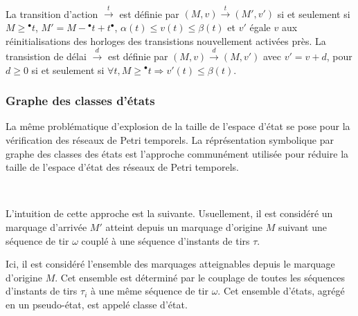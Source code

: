         ~

        La transition d'action $\xrightarrow{t}$ est définie par $(M,v)
        \xrightarrow{t}(M',v')$ si et seulement si $M \geq {}^{\bullet}t$, $M' =
        M - {}^{\bullet}t + t{}^{\bullet}$, $\alpha(t) \leq v(t) \leq \beta(t)$
        et $v'$ égale $v$ aux réinitialisations des horloges des transistions
        nouvellement activées près. La transistion de délai $\xrightarrow{d}$
        est définie par $(M,v) \xrightarrow{d} (M,v')$ avec $v' = v + d$, pour
        $d \geq 0$ si et seulement si $\forall t, M \geq {}^{\bullet}t
        \Rightarrow v'(t) \leq \beta (t)$.
    
      \subsubsection{Graphe des classes d'états}
      \label{sec:state-class-graph}
    
        La même problématique d'explosion de la taille de l'espace d'état se
        pose pour la vérification des réseaux de Petri temporels. La
        réprésentation symbolique par graphe des classes des états
        \cite{berthomieu91} est l'approche communément utilisée pour réduire la
        taille de l'espace d'état des réseaux de Petri temporels.
        
        ~

        L'intuition de cette approche est la suivante. Usuellement, il est
        considéré un marquage d'arrivée $M'$ atteint depuis un marquage
        d'origine $M$ suivant une séquence de tir $\omega$ couplé à une séquence
        d'instants de tirs $\tau$.

        Ici, il est considéré l'ensemble des marquages atteignables depuis le
        marquage d'origine $M$. Cet ensemble est déterminé par le couplage de
        toutes les séquences d'instants de tirs $\tau_i$ à une même séquence de
        tir $\omega$. Cet ensemble d'états, agrégé en un pseudo-état, est appelé
        classe d'état.

      
        
        ~
        
